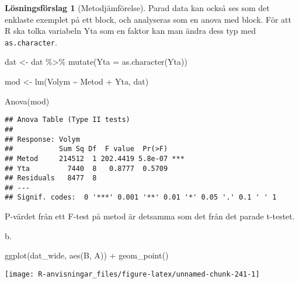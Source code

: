 \documentclass[
]{book}
\newenvironment{Shaded}{\begin{snugshade}}{\end{snugshade}}
\newcommand{\AttributeTok}[1]{\textcolor[rgb]{0.77,0.63,0.00}{#1}}
\newcommand{\FunctionTok}[1]{\textcolor[rgb]{0.00,0.00,0.00}{#1}}
\newcommand{\NormalTok}[1]{#1}
\newcommand{\OtherTok}[1]{\textcolor[rgb]{0.56,0.35,0.01}{#1}}
\newcommand{\SpecialCharTok}[1]{\textcolor[rgb]{0.00,0.00,0.00}{#1}}
\theoremstyle{definition}
\theoremstyle{definition}
\theoremstyle{definition}
\theoremstyle{definition}
\newtheorem{hypothesis}{Lösningsförslag}[chapter]
\theoremstyle{remark}
\begin{document}
\begin{hypothesis}[Metodjämförelse]
Parad data kan också ses som det enklaste exemplet på ett block, och analyseras som en anova med block. För att R ska tolka variabeln Yta som en faktor kan man ändra dess typ med \texttt{as.character}.

\begin{Shaded}
\begin{Highlighting}[]
\NormalTok{dat }\OtherTok{\textless{}{-}}\NormalTok{ dat }\SpecialCharTok{\%\textgreater{}\%} \FunctionTok{mutate}\NormalTok{(}\AttributeTok{Yta =} \FunctionTok{as.character}\NormalTok{(Yta))}

\NormalTok{mod }\OtherTok{\textless{}{-}} \FunctionTok{lm}\NormalTok{(Volym }\SpecialCharTok{\textasciitilde{}}\NormalTok{ Metod }\SpecialCharTok{+}\NormalTok{ Yta, dat)}

\FunctionTok{Anova}\NormalTok{(mod)}
\end{Highlighting}
\end{Shaded}

\begin{verbatim}
## Anova Table (Type II tests)
## 
## Response: Volym
##           Sum Sq Df  F value  Pr(>F)    
## Metod     214512  1 202.4419 5.8e-07 ***
## Yta         7440  8   0.8777  0.5709    
## Residuals   8477  8                     
## ---
## Signif. codes:  0 '***' 0.001 '**' 0.01 '*' 0.05 '.' 0.1 ' ' 1
\end{verbatim}

P-värdet från ett F-test på metod är detsamma som det från det parade t-testet.

b.

\begin{Shaded}
\begin{Highlighting}[]
\FunctionTok{ggplot}\NormalTok{(dat\_wide, }\FunctionTok{aes}\NormalTok{(B, A)) }\SpecialCharTok{+} 
  \FunctionTok{geom\_point}\NormalTok{()}
\end{Highlighting}
\end{Shaded}

\begin{center}\texttt{[image: R-anvisningar\_files/figure-latex/unnamed-chunk-241-1]} \end{center}

\begin{Shaded}
\end{Shaded}


\end{hypothesis}
\end{document}
